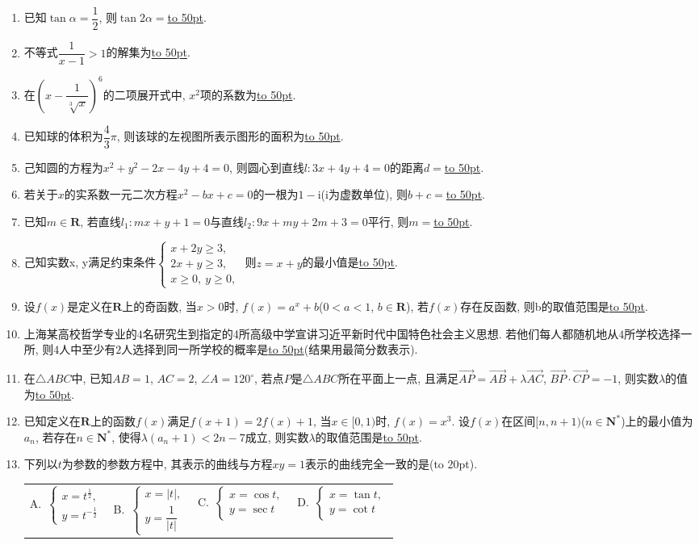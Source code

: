 \documentclass[10pt,a4paper]{article}
\newcommand{\blank}[1]{\underline{\hbox to #1pt{}}}
\newcommand{\bracket}[1]{(\hbox to #1pt{})}
\newcommand{\fourch}[4]{\par\begin{tabular}{p{.23\textwidth}p{.23\textwidth}p{.23\textwidth}p{.23\textwidth}}
A.~#1 &B.~#2& C.~#3& D.~#4
\end{tabular}}
\begin{document}
\begin{enumerate}[1.]
\item 已知$\tan \alpha =\dfrac 12$, 则$\tan 2\alpha =$\blank{50}.
\item 不等式$\dfrac 1{x-1}>1$的解集为\blank{50}.
\item 在$(x-\dfrac 1{\sqrt[3]x})^6$的二项展开式中, $x^2$项的系数为\blank{50}.
\item 已知球的体积为$\dfrac 43\pi$, 则该球的左视图所表示图形的面积为\blank{50}.
\item 己知圆的方程为$x^2+y^2-2x-4y+4=0$, 则圆心到直线$l:3x+4y+4=0$的距离$d=$\blank{50}.
\item 若关于$x$的实系数一元二次方程$x^2-bx+c=0$的一根为$1-\mathrm{i}$($\mathrm{i}$为虚数单位), 则$b+c=$\blank{50}.
\item 已知$m\in \mathbf{R}$, 若直线$l_1:mx+y+1=0$与直线$l_2:9x+my+2m+3=0$平行, 则$m=$\blank{50}.
\item 己知实数x, y满足约束条件$\begin{cases} x+2y\ge 3, \\ 2x+y\ge 3, \\ x\ge 0, \ y\ge 0, \end{cases}$ 则$z=x+y$的最小值是\blank{50}.
\item 设$f(x)$是定义在$\mathbf{R}$上的奇函数, 当$x>0$时, $f(x)=a^x+b$($0<a<1$, $b\in \mathbf{R}$), 若$f(x)$存在反函数, 则b的取值范围是\blank{50}.
\item 上海某高校哲学专业的$4$名研究生到指定的4所高级中学宣讲习近平新时代中国特色社会主义思想. 若他们每人都随机地从$4$所学校选择一所, 则$4$人中至少有$2$人选择到同一所学校的概率是\blank{50}(结果用最简分数表示).
\item 在$\triangle ABC$中, 已知$AB=1$, $AC=2$, $\angle A=120^\circ$, 若点$P$是$\triangle ABC$所在平面上一点, 且满足$\overrightarrow{AP}=\overrightarrow{AB}+\lambda \overrightarrow{AC}$, $\overrightarrow{BP}\cdot \overrightarrow{CP}=-1$, 则实数$\lambda$的值为\blank{50}.
\item 已知定义在$\mathbf{R}$上的函数$f(x)$满足$f(x+1)=2f(x)+1$, 当$x\in [0,1)$时, $f(x)=x^3$. 设$f(x)$在区间$[n,n+1)$($n\in \mathbf{N}^*$)上的最小值为$a_n$, 若存在$n\in \mathbf{N}^*$, 使得$\lambda (a_n+1)<2n-7$成立, 则实数$\lambda$的取值范围是\blank{50}.
\item 下列以$t$为参数的参数方程中, 其表示的曲线与方程$xy=1$表示的曲线完全一致的是\bracket{20}.
\fourch{$\begin{cases} x={t^{\frac 12}}, \\ y={t^{-\frac 12}} \end{cases}$}{$\begin{cases} x=|t|, \\ y=\dfrac 1{|t|} \end{cases}$}{$\begin{cases} x=\cos t, \\ y=\sec t \end{cases}$}{$\begin{cases}  x=\tan t, \\ y=\cot t \end{cases}$}

\end{enumerate}
\end{document}
